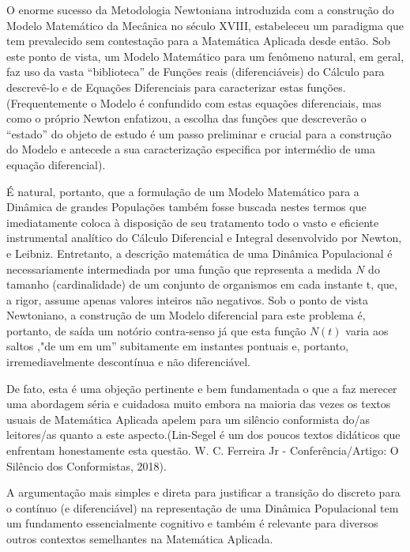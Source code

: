     O enorme sucesso da Metodologia Newtoniana introduzida com a construção do Modelo Matemático da Mecânica no século XVIII, estabeleceu um paradigma que tem prevalecido sem contestação para a Matemática Aplicada desde então. Sob este ponto de vista, um Modelo Matemático para um fenômeno natural, em geral, faz uso da vasta ``biblioteca'' de Funções reais (diferenciáveis) do Cálculo para descrevê-lo e de Equações Diferenciais para caracterizar estas funções.(Frequentemente o Modelo é confundido com estas equações diferenciais, mas como o próprio Newton enfatizou, a escolha das funções que descreverão o ``estado'' do objeto de estudo é um passo preliminar e crucial para a construção do Modelo e antecede a sua caracterização especifica por intermédio de uma equação diferencial).

    É natural, portanto, que a formulação de um Modelo Matemático para a Dinâmica de grandes Populações também fosse buscada nestes termos que imediatamente coloca à disposição de seu tratamento todo o vasto e eficiente instrumental analítico do Cálculo Diferencial e Integral desenvolvido por Newton, e Leibniz. Entretanto, a descrição matemática de uma Dinâmica Populacional é necessariamente intermediada por uma função que representa a medida \(N\) do tamanho (cardinalidade) de um conjunto de organismos em cada instante t, que, a rigor, assume apenas valores inteiros não negativos. Sob o ponto de vista Newtoniano, a construção de um Modelo diferencial para este problema é, portanto, de saída um notório contra-senso já que esta função \(N(t)\) varia aos saltos ,"de um em um'' subitamente em instantes pontuais e, portanto, irremediavelmente descontínua e não diferenciável.

    De fato, esta é uma objeção pertinente e bem fundamentada o que a faz merecer uma abordagem séria e cuidadosa muito embora na maioria das vezes os textos usuais de Matemática Aplicada apelem para um silêncio conformista do/as leitores/as quanto a este aspecto.(Lin-Segel é um dos poucos textos didáticos que enfrentam honestamente esta questão. W. C. Ferreira Jr - Conferência/Artigo: O Silêncio dos Conformistas, 2018).

    A argumentação mais simples e direta para justificar a transição do discreto para o contínuo (e diferenciável) na representação de uma Dinâmica Populacional tem um fundamento essencialmente cognitivo e também é relevante para diversos outros contextos semelhantes na Matemática Aplicada.

